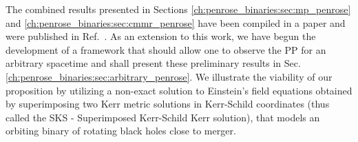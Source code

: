 The combined results presented in Sections \ref{ch:penrose_binaries:sec:mp_penrose} and \ref{ch:penrose_binaries:sec:cmmr_penrose} have been compiled in a paper and were published in Ref.~\cite{PhysRevD.104.124025}. As an extension to this work, we have begun the development of a framework that should allow one to observe the \ac{PP} for an arbitrary spacetime and shall present these preliminary results in Sec. \ref{ch:penrose_binaries:sec:arbitrary_penrose}. We illustrate the viability of our proposition by utilizing a non-exact solution to Einstein's field equations obtained by superimposing two Kerr metric solutions in Kerr-Schild coordinates (thus called the \ac{SKS} - Superimposed Kerr-Schild Kerr solution), that models an orbiting binary of rotating black holes close to merger.